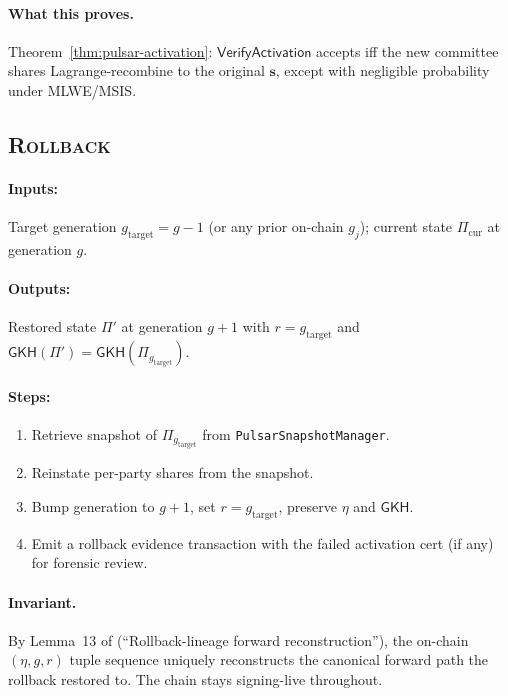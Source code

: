 \paragraph{What this proves.} Theorem~\ref{thm:pulsar-activation}:
$\mathsf{VerifyActivation}$ accepts iff the new committee shares
Lagrange-recombine to the original $\mathbf{s}$, except with negligible
probability under MLWE/MSIS.

\subsection{\textsc{Rollback}}
\label{sec:protocol:rollback}

\paragraph{Inputs:} Target generation $g_{\mathrm{target}} = g - 1$
(or any prior on-chain $g_j$); current state $\Pi_{\mathrm{cur}}$ at
generation $g$.

\paragraph{Outputs:} Restored state $\Pi'$ at generation $g+1$ with
$r = g_{\mathrm{target}}$ and $\mathsf{GKH}(\Pi') = \mathsf{GKH}(\Pi_{
g_{\mathrm{target}}})$.

\paragraph{Steps:}
\begin{enumerate}[leftmargin=2em, nosep]
\item Retrieve snapshot of $\Pi_{g_{\mathrm{target}}}$ from
      \texttt{PulsarSnapshotManager}.
\item Reinstate per-party shares from the snapshot.
\item Bump generation to $g + 1$, set $r = g_{\mathrm{target}}$,
      preserve $\eta$ and $\mathsf{GKH}$.
\item Emit a rollback evidence transaction with the failed activation
      cert (if any) for forensic review.
\end{enumerate}

\paragraph{Invariant.} By Lemma~13 of \cite{quasarcertsoundness}
(``Rollback-lineage forward reconstruction''), the on-chain
$(\eta, g, r)$ tuple sequence uniquely reconstructs the canonical
forward path the rollback restored to. The chain stays signing-live
throughout.

